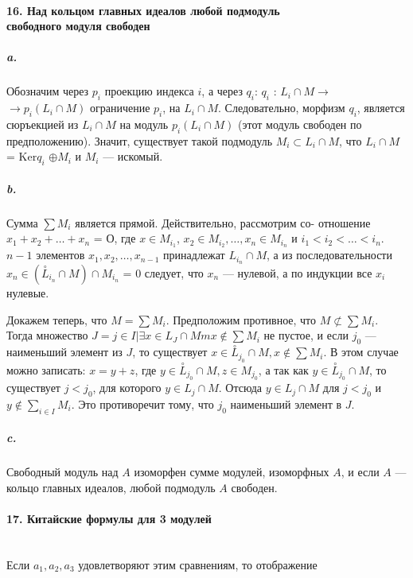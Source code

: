 {\paragraph{16. Над кольцом главных идеалов любой подмодуль\\
свободного модуля свободен}

\subparagraph{a.} Обозначим через $p_{i}$ проекцию индекса $i$, а через $q_{i}$: $q_{i}$ : $L_{i} \cap M \rightarrow$
$\rightarrow p_{i}(L_{i} \cap M)$ ограничение $p_i$, на $L_{i} \cap M$. Следовательно, морфизм $q_{i}$, является сюръекцией из $L_{i} \cap M$ на модуль $p_{i}(L_{i} \cap M)$ (этот модуль свободен
по предположению). Значит, существует такой подмодуль $M_{i} \subset L_{i} \cap M$,
что $L_{i} \cap M$ = Ker{$q_{i}$} $\oplus M_{i}$ и $M_{i}$ — искомый.

\subparagraph{b.} Сумма $\sum M_{i}$ является прямой. Действительно, рассмотрим со-
отношение $x_{1} + x_2 +\dots+ x_n$ = О, где $x \in M_{i_1}$, $x_2 \in M_{i_2},\ldots,x_n \in M_{i_n}$ и
$i_1 < i_2 <\ldots< i_n$. $n - 1$ элементов $x_1, x_2,\ldots, x_{n-1}$ принадлежат $L_{i_n} \cap M$,
а из последовательности $x_n \in (\overset{\circ}{L}_{i_n} \cap M) \cap M_{i_n}$ = {0} следует, что $x_n$ ---
нулевой, а по индукции все $x_i$ нулевые.

Докажем теперь, что $M = \sum M_i$. Предположим противное, что
$M \not\subset \sum M_i$. Тогда множество $J = {j \in I | \exists x \in L_J \cap Mm x \notin \sum M_i}$
не пустое, и если $j_0$ — наименьший элемент из $J$, то существует
$x \in \overset{\circ}{L}_{j_0} \cap M, x \notin \sum M_i$. В этом случае можно записать: $x = y + z$,
где $y \in \overset{\circ}{L}_{j_0} \cap M, z \in M_{j_0}$, а так как $y \in \overset{\circ}{L}_{j_0} \cap M$, то существует $j < j_0$,
для которого $y \in L_j \cap M$. Отсюда $y \in L_j \cap M$ для $j < j_0$ и $y \notin \sum_{i \in I} M_i$.
Это противоречит тому, что $j_0$ наименьший элемент в $J$.

\subparagraph{c.} Свободный модуль над $A$ изоморфен сумме модулей, изоморфных
$A$, и если $A$ — кольцо главных идеалов, любой подмодуль $A$ свободен.

\paragraph{17. Китайские формулы для 3 модулей} \mbox{}\\

Если $a_1, a_2, a_3$ удовлетворяют этим сравнениям, то отображение

}
